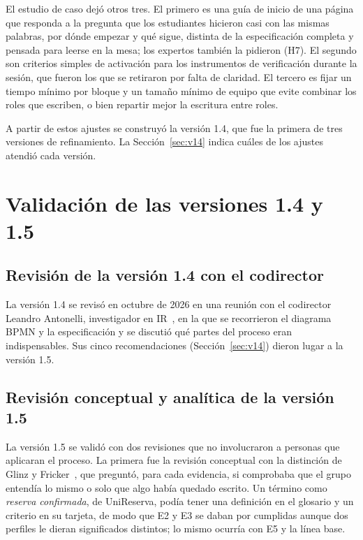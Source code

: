 \documentclass[12pt,letterpaper,oneside]{report}
\begin{document}
El estudio de caso dejó otros tres. El primero es una guía de inicio de una
página que responda a la pregunta que los estudiantes hicieron casi con las
mismas palabras, por dónde empezar y qué sigue, distinta de la especificación
completa y pensada para leerse en la mesa; los expertos también la pidieron
(H7). El segundo son criterios simples de activación para los instrumentos de
verificación durante la sesión, que fueron los que se retiraron por falta de
claridad. El tercero es fijar un tiempo mínimo por bloque y un tamaño mínimo de
equipo que evite combinar los roles que escriben, o bien repartir mejor la
escritura entre roles.

A partir de estos ajustes se construyó la versión 1.4, que fue la primera de
tres versiones de refinamiento. La Sección~\ref{sec:v14} indica cuáles de los
ajustes atendió cada versión.



\section{Validación de las versiones 1.4 y 1.5}
\label{sec:val_conceptual}

\subsection{Revisión de la versión 1.4 con el codirector}
La versión 1.4 se revisó en octubre de 2026 en una reunión con el codirector
Leandro Antonelli, investigador en IR~\cite{antonelli2016}, en la que se
recorrieron el diagrama BPMN y la especificación y se discutió qué partes del
proceso eran indispensables. Sus cinco recomendaciones (Sección~\ref{sec:v14})
dieron lugar a la versión 1.5.

\subsection{Revisión conceptual y analítica de la versión 1.5}
La versión 1.5 se validó con dos revisiones que no involucraron a personas que
aplicaran el proceso. La primera fue la revisión conceptual con la distinción
de Glinz y Fricker~\cite{glinz2015shared}, que preguntó, para cada evidencia, si
comprobaba que el grupo entendía lo mismo o solo que algo había quedado escrito.
Un término como \textit{reserva confirmada}, de UniReserva, podía tener una
definición en el glosario y un criterio en su tarjeta, de modo que E2 y E3 se
daban por cumplidas aunque dos perfiles le dieran significados distintos; lo
mismo ocurría con E5 y la línea base.
\end{document}
